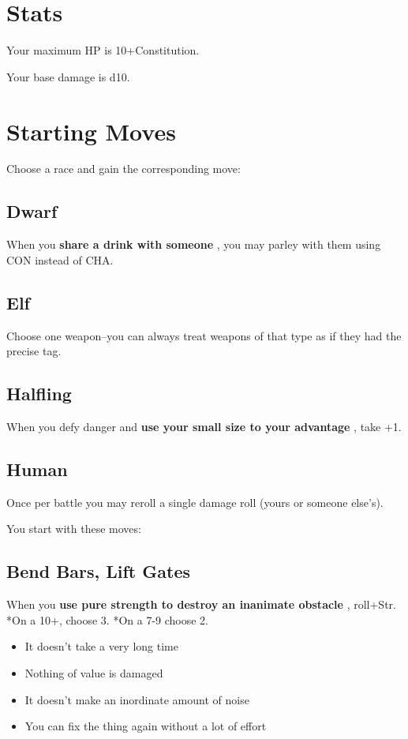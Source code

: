 \section{Stats}


 Your maximum HP is 10+Constitution.


 Your base damage is d10.
\section{Starting Moves}


 Choose a race and gain the corresponding move:
\subsection{Dwarf}


 When you \textbf{share a drink with someone}
, you may parley with them using CON instead of CHA.
\subsection{Elf}


 Choose one weapon--you can always treat weapons of that type as if they had the precise tag.
\subsection{Halfling}


 When you defy danger and \textbf{use your small size to your advantage}
, take +1.
\subsection{Human}


 Once per battle you may reroll a single damage roll (yours or someone else's).


 You start with these moves:
\subsection{Bend Bars, Lift Gates}


 When you \textbf{use pure strength to destroy an inanimate obstacle}
, roll+Str. *On a 10+, choose 3. *On a 7-9 choose 2.
\begin{itemize}
\item It doesn't take a very long time
\item Nothing of value is damaged
\item It doesn't make an inordinate amount of noise
\item You can fix the thing again without a lot of effort

\end{itemize}
